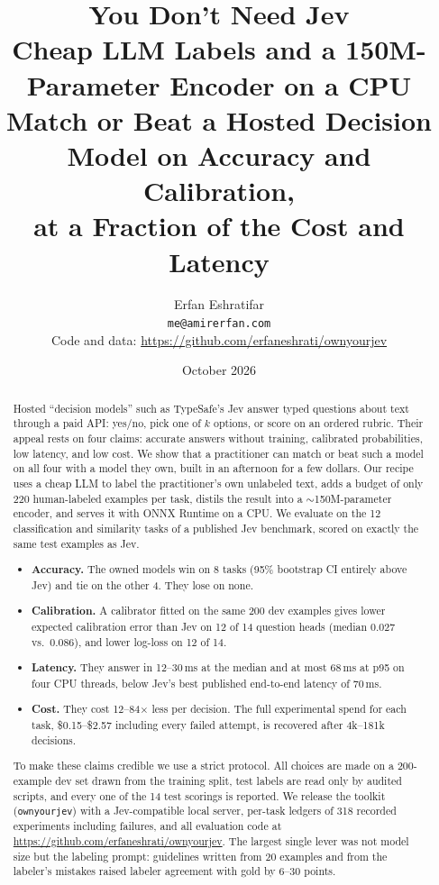 \documentclass[11pt]{article}
\title{You Don't Need Jev\\[4pt]
\large Cheap LLM Labels and a 150M-Parameter Encoder on a CPU\\ Match or Beat a Hosted Decision Model on Accuracy and Calibration,\\ at a Fraction of the Cost and Latency}
\author{Erfan Eshratifar\\ \texttt{me@amirerfan.com}\\[6pt] \normalsize Code and data: \url{https://github.com/erfaneshrati/ownyourjev}}
\date{October 2026}
\begin{document}
\maketitle

\begin{abstract}
Hosted ``decision models'' such as TypeSafe's Jev answer typed questions about text through a paid API: yes/no, pick one of $k$ options, or score on an ordered rubric.
Their appeal rests on four claims: accurate answers without training, calibrated probabilities, low latency, and low cost.
We show that a practitioner can match or beat such a model on all four with a model they own, built in an afternoon for a few dollars.
Our recipe uses a cheap LLM to label the practitioner's own unlabeled text, adds a budget of only 220 human-labeled examples per task, distils the result into a $\sim$150M-parameter encoder, and serves it with ONNX Runtime on a CPU.
We evaluate on the 12 classification and similarity tasks of a published Jev benchmark, scored on exactly the same test examples as Jev.
\begin{itemize}
  \item \textbf{Accuracy.} The owned models win on 8 tasks (95\% bootstrap CI entirely above Jev) and tie on the other 4. They lose on none.
  \item \textbf{Calibration.} A calibrator fitted on the same 200 dev examples gives lower expected calibration error than Jev on 12 of 14 question heads (median 0.027 vs.\ 0.086), and lower log-loss on 12 of 14.
  \item \textbf{Latency.} They answer in 12--30\,ms at the median and at most 68\,ms at p95 on four CPU threads, below Jev's best published end-to-end latency of 70\,ms.
  \item \textbf{Cost.} They cost 12--84$\times$ less per decision. The full experimental spend for each task, \$0.15--\$2.57 including every failed attempt, is recovered after 4k--181k decisions.
\end{itemize}
To make these claims credible we use a strict protocol. All choices are made on a 200-example dev set drawn from the training split, test labels are read only by audited scripts, and every one of the 14 test scorings is reported.
We release the toolkit (\texttt{ownyourjev}) with a Jev-compatible local server, per-task ledgers of 318 recorded experiments including failures, and all evaluation code at \url{https://github.com/erfaneshrati/ownyourjev}.
The largest single lever was not model size but the labeling prompt: guidelines written from 20 examples and from the labeler's mistakes raised labeler agreement with gold by 6--30 points.
\end{abstract}
\end{document}
